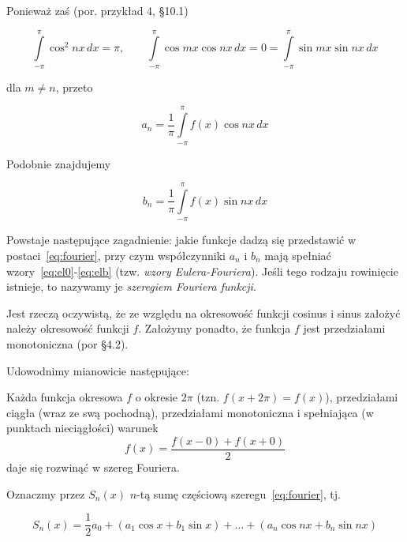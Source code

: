 \documentclass[leqno]{book}
\begin{document}
    Ponieważ zaś (por. przykład 4, \S 10.1)

    \[
        \int\limits_{-\pi}^{\pi} \cos^2 nx \,dx = \pi, \qquad
        \int\limits_{-\pi}^{\pi} \cos mx \cos nx \,dx = 0 = \int\limits_{-\pi}^{\pi} \sin mx \sin nx \,dx
    \]

    dla $m \neq n$, przeto

    \begin{equation}
        \label{eq:ela}
        a_n = \frac{1}{\pi} \int\limits_{-\pi}^{\pi} f(x) \cos nx \,dx
    \end{equation}

    Podobnie znajdujemy

    \begin{equation}
        \label{eq:elb}
        b_n = \frac{1}{\pi} \int\limits_{-\pi}^{\pi} f(x) \sin nx \,dx
    \end{equation}

    Powstaje następujące zagadnienie: jakie funkcje dadzą się przedstawić w postaci~\eqref{eq:fourier}, przy czym współczynniki $a_n$ i $b_n$ mają
    spełniać wzory~\eqref{eq:el0}-\eqref{eq:elb} (tzw. \textit{wzory Eulera-Fouriera}).
    Jeśli tego rodzaju rowinięcie istnieje, to nazywamy je \textit{szeregiem Fouriera funkcji}.

    Jest rzeczą oczywistą, że ze względu na okresowość funkcji cosinus i sinus założyć należy okresowość funkcji $f$.
    Założymy ponadto, że funkcja $f$ jest przedziałami monotoniczna (por \S 4.2).

    Udowodnimy mianowicie następujące:

    \begin{twierdzenie}
        Każda funkcja okresowa $f$ o okresie $2\pi$ (tzn. $f(x + 2\pi) = f(x)$), przedziałami ciągła (wraz ze swą pochodną),
        przedziałami monotoniczna i spełniająca (w punktach nieciągłości) warunek
        \begin{equation}
            \label{eq:statement}
            f(x) = \frac{f(x - 0) + f(x + 0)}{2}
        \end{equation}
        daje się rozwinąć w szereg Fouriera.
    \end{twierdzenie}

    Oznaczmy przez $S_n (x)$ $n$-tą sumę częściową szeregu~\eqref{eq:fourier}, tj.

    \begin{equation}
        \label{eq:sum}
        S_n(x) = \frac{1}{2} a_{0} + (a_1 \cos x + b_1 \sin x) + \ldots + (a_n \cos nx + b_n \sin nx)
    \end{equation}
\end{document}
